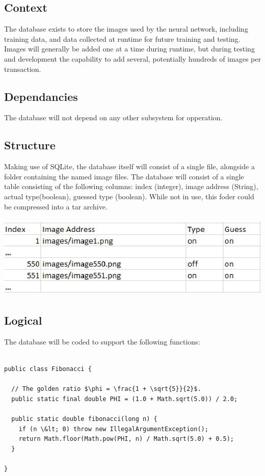 \subsection{Context}
The database exists to store the images used by the neural network, including training data, and data collected at runtime for future training and testing. Images will generally be added one at a time during runtime, but during testing and development the capability to add several, potentially hundreds of images per transaction. 

\subsection{Dependancies} 
The database will not depend on any other subsystem for opperation.

\subsection{Structure}
Making use of SQLite, the database itself will consist of a single file, alongside a folder containing the named image files. The database will consist of a single table consisting of the following columns: index (integer), image address (String), actual type(boolean), guessed type (boolean). While not in use, this foder could be compressed into a tar archive.


\includegraphics[height=4cm]{dbexample}

\subsection{Logical}

The database will be coded to support the following functions:

\begin{verbatim}

public class Fibonacci {
 
  // The golden ratio $\phi = \frac{1 + \sqrt{5}}{2}$.
  public static final double PHI = (1.0 + Math.sqrt(5.0)) / 2.0;
 
  public static double fibonacci(long n) {
    if (n \&lt; 0) throw new IllegalArgumentException();
    return Math.floor(Math.pow(PHI, n) / Math.sqrt(5.0) + 0.5);
  }
 
}


\end{verbatim}


